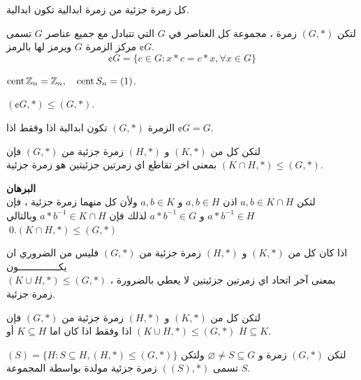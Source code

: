    \begin{note}
   	كل زمرة جزئية من زمرة ابدالية تكون ابدالية.
   \end{note}
   
   \begin{definition}
   	لتكن $(G, *)$ زمرة ، مجموعة كل العناصر في $G$ التي تتبادل مع جميع عناصر $G$ تسمى مركز الزمرة $G$ ويرمز لها بالرمز $\cent{G}$.
   	\[
   	\cent G = \{c \in G : x*c=c*x , \forall x\in G\}
   	\]
   \end{definition}
   
   \begin{example}
   	$\operatorname{cent}\mathbb{Z}_n=\mathbb{Z}_n, \quad \operatorname{cent} S_n = (1)$.
   \end{example}
   
   \begin{note}
   	$(\cent G, *) \leq (G, *)$.
   \end{note}
   
   \begin{lemma}
   	الزمرة $(G, *)$ تكون ابدالية اذا وفقط اذا $\cent G = G$.
   \end{lemma}
   
   \begin{theorem}
   	لتكن كل من $(K, *)$ و $(H, *)$ زمرة جزئية من $(G, *)$ فإن $(K \cap H, *) \leq (G, *)$ بمعنى اخر تقاطع اي زمرتين جزئيتين هو زمرة جزئية.
   \end{theorem}
\noindent
\textbf{البرهان}\\
\noindent
لتكن $a, b\in K\cap H$ اذن $a, b\in H$ و $a, b\in K$ ولأن كل منهما زمرة جزئية ، فإن 
$a*b^{-1} \in H$ و $a*b^{-1} \in G$
لذلك فإن $a*b^{-1} \in K\cap H$ وبالتالي  $(K \cap H, *) \leq (G, *)$.\qed
   
   \begin{note}
   	اذا كان كل من $(K, *)$ و $(H, *)$ زمرة جزئية من $(G, *)$  فليس من الضروري ان يكــــــــــــــون \\
   	$(K \cup H, *) \leq (G, *)$  ، بمعنى آخر اتحاد اي زمرتين جزئيتين لا يعطي بالضرورة زمرة جزئية.
   \end{note}
   
   \begin{theorem}
   	 	لتكن كل من $(K, *)$ و $(H, *)$ زمرة جزئية من $(G, *)$ فإن $(K \cup H, *) \leq (G, *)$ اذا وفقط اذا كان اما $K\subseteq H$ أو $H\subseteq K$.
   \end{theorem}
   
   \begin{definition}
   	لتكن $(G, *)$ زمرة و $\varnothing\neq S\subseteq G$ ولتكن
   	$(S) = \{H : S\subseteq H , (H, *) \leq (G, *)\}$
   	تسمى $((S), *)$ زمرة جزئية مولدة بواسطة المجموعة $S$.
   \end{definition}
   

